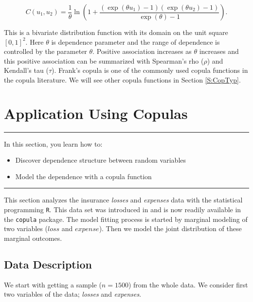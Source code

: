 \documentclass[]{book}
\providecommand{\tightlist}{%
  \setlength{\itemsep}{0pt}\setlength{\parskip}{0pt}}
\theoremstyle{definition}
\theoremstyle{definition}
\theoremstyle{definition}
\theoremstyle{remark}
\begin{document}
\[{C}(u_1,u_2) = \frac{1}{\theta} \ln \left( 1+ \frac{ (\exp(\theta
u_1) -1)(\exp(\theta u_2) -1)} {\exp(\theta) -1} \right).\]

This is a bivariate distribution function with its domain on the unit
square \([0,1]^2.\) Here \(\theta\) is dependence parameter and the
range of dependence is controlled by the parameter \(\theta\). Positive
association increases as \(\theta\) increases and this positive
association can be summarized with Spearman's rho (\(\rho\)) and
Kendall's tau (\(\tau\)). Frank's copula is one of the commonly used
copula functions in the copula literature. We will see other copula
functions in Section \ref{S:CopTyp}.

\section{Application Using Copulas}\label{S:CopAppl}

\begin{center}\rule{0.5\linewidth}{\linethickness}\end{center}

In this section, you learn how to:

\begin{itemize}
\tightlist
\item
  Discover dependence structure between random variables
\item
  Model the dependence with a copula function
\end{itemize}

\begin{center}\rule{0.5\linewidth}{\linethickness}\end{center}

This section analyzes the insurance \emph{losses } and \emph{expenses }
data with the statistical programming \texttt{R}. This data set was
introduced in \citet{frees1998understanding} and is now readily
available in the \texttt{copula} package. The model fitting process is
started by marginal modeling of two variables (\(loss\) and
\(expense\)). Then we model the joint distribution of these marginal
outcomes.

\subsection{Data Description}\label{data-description}

We start with getting a sample (\(n = 1500\)) from the whole data. We
consider first two variables of the data; \emph{losses} and
\emph{expenses}.
\end{document}
